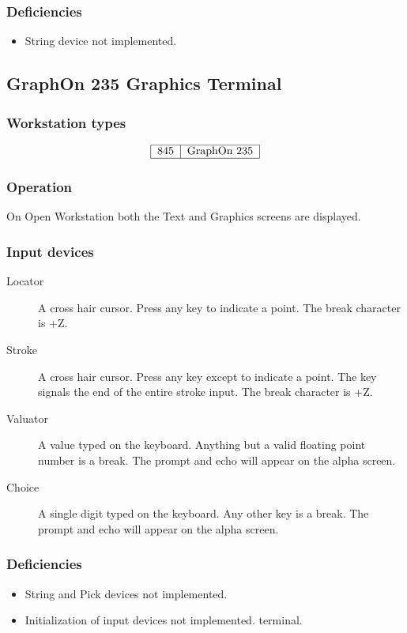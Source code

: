 \subsubsection{Deficiencies}
\begin{itemize}
\item String device not implemented.
\end{itemize}
\subsection{GraphOn 235 Graphics Terminal}
\label{gragt}
\subsubsection{Workstation types}
\[\begin{tabular}{|l|l|}\hline
845 &GraphOn 235\\\hline
\end{tabular}\]

\subsubsection{Operation}
On Open Workstation both the Text and Graphics screens are displayed.

\subsubsection{Input devices}
\begin{description}
\item[Locator] A cross hair cursor.
Press any key to indicate a point.
The break character is +Z.
\item[Stroke] A cross hair cursor.
Press any key except  to indicate a point.
The  key signals the end of the entire stroke input.
The break character is +Z.
\item[Valuator] A value typed on the keyboard.
Anything but a valid floating point number is a break.
The prompt and echo will appear on the alpha screen.
\item[Choice] A single digit typed on the keyboard.
Any other key is a break.
The prompt and echo will appear on the alpha screen.
\end{description}

\subsubsection{Deficiencies}
\begin{itemize}
\item String and Pick devices not implemented.
\item Initialization of input devices not implemented.
terminal.
\end{itemize}

